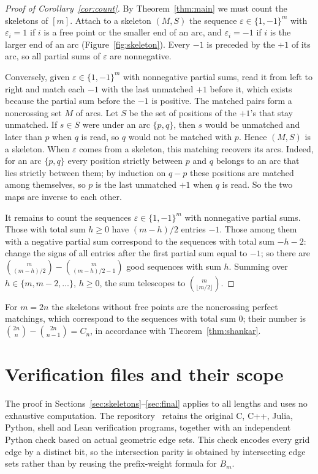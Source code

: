 \documentclass[screen]{aomart}
\theoremstyle{definition}
\theoremstyle{remark}
\numberwithin{equation}{section}
\begin{document}
\begin{proof}[Proof of Corollary~\ref{cor:count}]
By Theorem~\ref{thm:main} we must count the skeletons of $[m]$. Attach to a skeleton $(M,S)$ the sequence $\varepsilon\in\{1,-1\}^m$ with $\varepsilon_i=1$ if $i$ is a free point or the smaller end of an arc, and $\varepsilon_i=-1$ if $i$ is the larger end of an arc (Figure~\ref{fig:skeleton}). Every $-1$ is preceded by the $+1$ of its arc, so all partial sums of $\varepsilon$ are nonnegative.

Conversely, given $\varepsilon\in\{1,-1\}^m$ with nonnegative partial sums, read it from left to right and match each $-1$ with the last unmatched $+1$ before it, which exists because the partial sum before the $-1$ is positive. The matched pairs form a noncrossing set $M$ of arcs. Let $S$ be the set of positions of the $+1$'s that stay unmatched. If $s\in S$ were under an arc $\{p,q\}$, then $s$ would be unmatched and later than $p$ when $q$ is read, so $q$ would not be matched with $p$. Hence $(M,S)$ is a skeleton. When $\varepsilon$ comes from a skeleton, this matching recovers its arcs. Indeed, for an arc $\{p,q\}$ every position strictly between $p$ and $q$ belongs to an arc that lies strictly between them; by induction on $q-p$ these positions are matched among themselves, so $p$ is the last unmatched $+1$ when $q$ is read. So the two maps are inverse to each other.

It remains to count the sequences $\varepsilon\in\{1,-1\}^m$ with nonnegative partial sums. Those with total sum $h\ge0$ have $(m-h)/2$ entries $-1$. Those among them with a negative partial sum correspond to the sequences with total sum $-h-2$: change the signs of all entries after the first partial sum equal to $-1$; so there are $\binom{m}{(m-h)/2}-\binom{m}{(m-h)/2-1}$ good sequences with sum $h$. Summing over $h\in\{m,m-2,\dots\}$, $h\ge0$, the sum telescopes to $\binom{m}{\lfloor m/2\rfloor}$.
\end{proof}

For $m=2n$ the skeletons without free points are the noncrossing perfect matchings, which correspond to the sequences with total sum $0$; their number is $\binom{2n}{n}-\binom{2n}{n-1}=C_n$, in accordance with Theorem~\ref{thm:shankar}.


\appendix
\section{Verification files and their scope}\label{app:verification}
The proof in Sections~\ref{sec:skeletons}--\ref{sec:final} applies to all lengths and uses no exhaustive computation. The repository~\cite{Revision} retains the original C, C++, Julia, Python, shell and Lean verification programs, together with an independent Python check based on actual geometric edge sets. This check encodes every grid edge by a distinct bit, so the intersection parity is obtained by intersecting edge sets rather than by reusing the prefix-weight formula for $B_m$.
\end{document}
